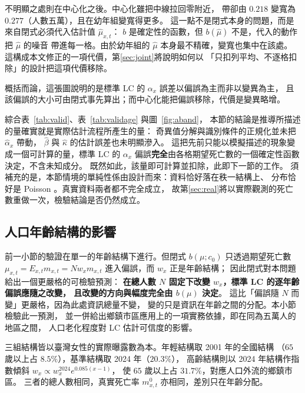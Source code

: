 \documentclass[UTF8, fontset=macnew, a4paper, 12pt]{ctexart}
\begin{document}
不明顯之處則在中心化之後。中心化雖把中線拉回零附近，
帶卻由 $0.218$ 變寬為 $0.277$（人數五萬），且在幼年組變寬得更多。
這一點不是閉式本身的問題，而是來自閉式必須代入估計值 $\hat\mu_{x,t}$：
$b$ 是確定性的函數，但 $b(\hat\mu)$ 不是，代入的動作把 $\hat\mu$ 的噪音
帶進每一格。由於幼年組的 $\hat\mu$ 本身最不精確，變寬也集中在該處。
這構成本文修正的一項代價，第\ref{sec:joint}將說明如何以
「只扣列平均、不逐格扣除」的設計把這項代價移除。

概括而論，這張圖說明的是標準 LC 的 $\alpha_x$ 誤差以偏誤為主而非以變異為主，
且該偏誤的大小可由閉式事先算出；而中心化能把偏誤移除，代價是變異略增。

綜合表~\ref{tab:valid}、表~\ref{tab:validage} 與圖~\ref{fig:aband}，
本節的結論是推導所描述的量確實就是實際估計流程所產生的量：
奇異值分解與識別條件的正規化並未把 $\hat\alpha_x$ 帶動，
$\hat\beta$ 與 $\hat\kappa$ 的估計誤差也未明顯滲入。
這把先前只能以模擬描述的現象變成一個可計算的量，標準 LC 的 $\alpha_x$
偏誤\textbf{完全}由各格期望死亡數的一個確定性函數決定，不含未知成分。
既然如此，該量即可計算並扣除，此即下一節的工作。
須補充的是，本節情境的單純性係由設計而來：資料恰好落在秩一結構上、
分布恰好是 Poisson 。真實資料兩者都不完全成立，
故第\ref{sec:real}將以實際觀測的死亡數重做一次，檢驗結論是否仍然成立。

\subsection{人口年齡結構的影響}\label{sec:popstr}

前一小節的驗證在單一的年齡結構下進行。但閉式 $b(\mu;c_0)$ 只透過期望死亡數
$\mu_{x,t}=E_{x,t}m_{x,t}=N w_x m_{x,t}$ 進入偏誤，而 $w_x$ 正是年齡結構；
因此閉式對本問題給出一個更嚴格的可檢驗預測：
\textbf{在總人數 $N$ 固定下改變 $w_x$，標準 LC 的逐年齡偏誤應隨之改變，
且改變的方向與幅度完全由 $b(\mu)$ 決定}。
這比「偏誤隨 $N$ 而變」更嚴格，因為此處資訊總量不變，
變的只是資訊在年齡之間的分配。本小節檢驗此一預測，
並一併給出鄉鎮市區應用上的一項實務依據，即在同為五萬人的地區之間，
人口老化程度對 LC 估計可信度的影響。

三組結構皆以臺灣女性的實際曝露數為本。年輕結構取 2001 年的全國結構
（$65$ 歲以上占 $8.5\%$），基準結構取 2024 年（$20.3\%$），
高齡結構則以 2024 年結構作指數傾斜 $w_x\propto w_x^{2024}e^{0.085(x-1)}$，
使 $65$ 歲以上占 $31.7\%$，對應人口外流的鄉鎮市區。
三者的總人數相同，真實死亡率 $m^{0}_{x,t}$ 亦相同，差別只在年齡分配。
\end{document}
